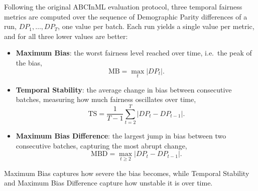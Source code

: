 Following the original ABCInML evaluation protocol, three temporal fairness metrics are computed over the
sequence of Demographic Parity differences of a run, $DP_1, \dots, DP_T$, one value per batch. Each run
yields a single value per metric, and for all three lower values are better:

\begin{itemize}
  \item \textbf{Maximum Bias}: the worst fairness level reached over time, i.e.\ the peak of the bias,
    \begin{equation}
      \mathrm{MB} = \max_{t} \lvert DP_t \rvert .
    \end{equation}
  \item \textbf{Temporal Stability}: the average change in bias between consecutive batches, measuring how much
    fairness oscillates over time,
    \begin{equation}
      \mathrm{TS} = \frac{1}{T-1} \sum_{t=2}^{T} \lvert DP_t - DP_{t-1} \rvert .
    \end{equation}
  \item \textbf{Maximum Bias Difference}: the largest jump in bias between two consecutive batches, capturing the
    most abrupt change,
    \begin{equation}
      \mathrm{MBD} = \max_{t \geq 2} \lvert DP_t - DP_{t-1} \rvert .
    \end{equation}
\end{itemize}

Maximum Bias captures how severe the bias becomes, while Temporal Stability and Maximum Bias Difference capture how
unstable it is over time.
